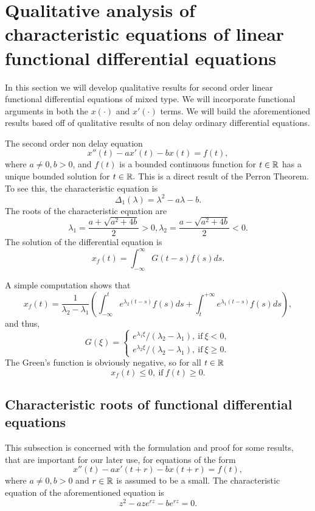 \documentclass[12pt,letterpaper]{amsart}
\theoremstyle{definition}
\theoremstyle{remark}
\numberwithin{equation}{section}
\begin{document}
\section{Qualitative analysis of characteristic equations of linear functional differential equations}\label{linear}
In this section we will develop qualitative results for second order linear functional differential equations of mixed type. We will incorporate functional arguments in both the $x(\cdot)$ and $x'(\cdot)$ terms. We will build the aforementioned results based off of qualitative results of non delay ordinary differential equations.

The second order non delay equation 
\begin{equation} \label{NDE}
x''(t)-ax'(t)-bx(t)=f(t),
\end{equation} 
where $a\not=0,b>0$,  and $f(t)$ is a bounded continuous function for $t\in \mathbb R$ has a unique bounded solution for $t\in \mathbb R.$ This is a direct result of the Perron Theorem. To see this, the characteristic equation is \[\Delta_1(\lambda)=\lambda^2-a\lambda -b.\] The roots of the characteristic equation are 
\begin{equation*}
    \lambda_1=\frac{a+\sqrt{a^2+4b}}{2}>0,
    \lambda_2=\frac{a-\sqrt{a^2+4b}}{2}<0. 
\end{equation*}
The solution of the differential equation is 
\[x_f(t)=\int_{-\infty}^{\infty}G(t-s)f(s)ds.\]

A simple computation shows that
\begin{equation}
x_f(t)= \frac{1}{\lambda_2-\lambda_1} \left( \int^t_{-\infty} e^{\lambda _2 (t-s)}f(s)ds +\int^{+\infty}_t e^{\lambda_1 (t-s)}f(s)ds \right) ,
\end{equation}
and thus,
\begin{equation}
G(\xi )=\begin{cases}
e^{\lambda_1 \xi }/(\lambda_2-\lambda_1), \ \mbox{if} \ \xi < 0,\\  
e^{\lambda_2 \xi }/(\lambda_2-\lambda_1) , \ \mbox{if} \ \xi \ge  0.
\end{cases}
\end{equation}
The Green's function is obviously negative, so for all $t\in \mathbb R$
$$
x_f(t) \le 0, \ \mbox{if} \ f(t)\ge 0 .
$$
\subsection{Characteristic roots of functional differential equations}
This subsection is concerned with the formulation and proof for some results, that are important  for our later use, for equations of the form
\begin{equation}\label{inho}
x''(t) -ax'(t+r)-bx(t+r)=f(t),
\end{equation}
where $a\not=0, b>0$ and $r\in\mathbb R$ is assumed to be a small. The characteristic equation of the aforementioned equation is 
\begin{equation}\label{c}
z^2-aze^{rz}-be^{rz}=0.
\end{equation}
\end{document}
